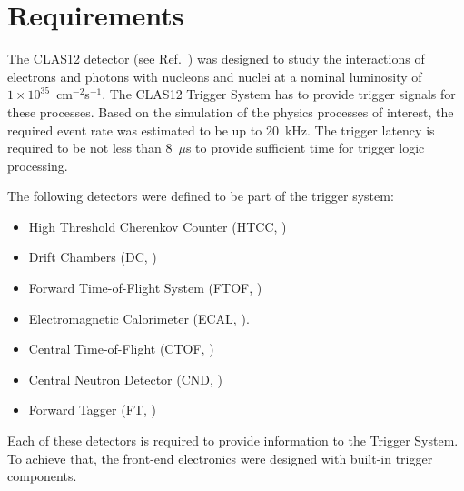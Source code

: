 \section{Requirements}

The CLAS12 detector (see Ref.~\cite{overview-ref}) was designed to study the interactions of electrons and photons with nucleons and nuclei at a nominal luminosity of $1\times 10^{35}$~cm$^{-2}$s$^{-1}$. The CLAS12 Trigger System has to provide trigger signals for these processes. Based on the simulation of the physics processes of interest, the required event rate was estimated to be up to 20~kHz. The trigger latency is required to be not less than 8~$\mu$s to provide sufficient time for trigger logic processing.


The following detectors were defined to be part of the trigger system:

\begin{itemize}
	\item High Threshold Cherenkov Counter (HTCC, \cite{htcc-ref})
	\item Drift Chambers (DC, \cite{dc-ref})
	\item Forward Time-of-Flight System (FTOF, \cite{ftof-ref})
	\item Electromagnetic Calorimeter (ECAL, \cite{ec-ref}).
	\item Central Time-of-Flight (CTOF, \cite{ctof-ref})
	\item Central Neutron Detector (CND, \cite{cnd-ref})
	\item Forward Tagger (FT, \cite{ft-ref})
\end{itemize}

Each of these detectors is required to provide information to the Trigger System. To achieve that, the front-end electronics were designed with built-in trigger components. 

 
